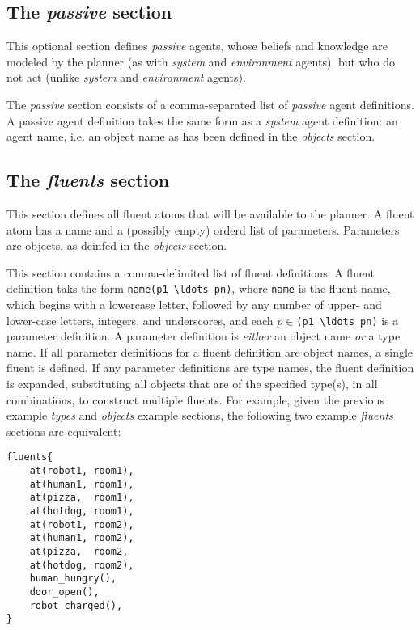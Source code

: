 \documentclass{article}
\begin{document}
\subsection{The \emph{passive} section}

This optional section defines \emph{passive} agents, whose beliefs and knowledge are
modeled by the planner (as with \emph{system} and \emph{environment} agents), but
who do not act (unlike \emph{system} and \emph{environment} agents).

The \emph{passive} section consists of a comma-separated list of \emph{passive} agent
definitions. A passive agent definition takes the same form as a \emph{system}
agent definition: an agent name, i.e. an object name as has been defined in the
\emph{objects} section.


\subsection{The \emph{fluents} section}

This section defines all fluent atoms that will be available to the planner. A
fluent atom has a name and a (possibly empty) orderd list of parameters. Parameters are
objects, as deinfed in the \emph{objects} section.

This section contains a comma-delimited list of fluent definitions. A fluent
definition taks the form \verb|name(p1 \ldots pn)|, where \verb|name| is the
fluent name, which begins with a lowercase letter, followed by any number of
upper- and lower-case letters, integers, and underscores, and each
$p\in$\verb|(p1 \ldots pn)| is a parameter definition. A parameter definition is
\emph{either} an object name \emph{or} a type name. If all parameter definitions
for a fluent definition are object names, a single fluent is defined. If any
parameter definitions are type names, the fluent definition is expanded,
substituting all objects that are of the specified type(s), in all combinations, to
construct multiple fluents. For example, given the previous example \emph{types}
and \emph{objects} example sections, the following two example
\emph{fluents} sections are equivalent:

\begin{verbatim}
fluents{
    at(robot1, room1),
    at(human1, room1),
    at(pizza,  room1),
    at(hotdog, room1),
    at(robot1, room2),
    at(human1, room2),
    at(pizza,  room2,
    at(hotdog, room2),
    human_hungry(),
    door_open(),
    robot_charged(),
}
\end{verbatim}
\end{document}
